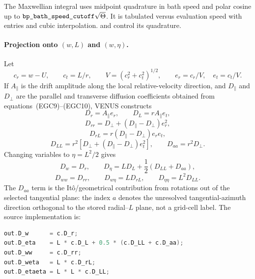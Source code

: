 The Maxwellian integral uses midpoint quadrature in bath speed and polar
cosine up to
\(\code{bp_bath_speed_cutoff}\sqrt{\Theta}\).  It is tabulated versus evaluation
speed with  entries and cubic interpolation.
 and  control its
quadrature.

\paragraph{Projection onto \((w,L)\) and \((w,\eta)\).}
Let
\[
 c_r=w-U,\qquad c_t=L/r,\qquad
 V=(c_r^2+c_t^2)^{1/2},\qquad e_r=c_r/V,\quad e_t=c_t/V.
\]
If \(A_\parallel\) is the drift amplitude along the local relative-velocity
direction, and \(D_\parallel\) and \(D_\perp\) are the parallel and transverse
diffusion coefficients obtained from equations~(EGC9)--(EGC10), VENUS
constructs
\[
 D_r=A_\parallel e_r,\qquad
 D_L=rA_\parallel e_t,                                   \tag{EGC13}
\]
\[
 D_{rr}=D_\perp+(D_\parallel-D_\perp)e_r^2,
\]
\[
 D_{rL}=r(D_\parallel-D_\perp)e_re_t,
\]
\[
 D_{LL}=r^2[D_\perp+(D_\parallel-D_\perp)e_t^2],
 \qquad D_{aa}=r^2D_\perp.                               \tag{EGC14}
\]
Changing variables to \(\eta=L^2/2\) gives
\[
 D_w=D_r,\qquad
 D_\eta=LD_L+\frac12(D_{LL}+D_{aa}),                     \tag{EGC15}
\]
\[
 D_{ww}=D_{rr},\qquad
 D_{w\eta}=LD_{rL},\qquad
 D_{\eta\eta}=L^2D_{LL}.                                 \tag{EGC16}
\]
The \(D_{aa}\) term is the It\^o/geometrical contribution from rotations out
of the selected tangential plane: the index \(a\) denotes the unresolved
tangential-azimuth direction orthogonal to the stored radial--\(L\) plane,
not a grid-cell label.  The source implementation is:
\begin{lstlisting}[language=C++]
out.D_w      = c.D_r;
out.D_eta    = L * c.D_L + 0.5 * (c.D_LL + c.D_aa);
out.D_ww     = c.D_rr;
out.D_weta   = L * c.D_rL;
out.D_etaeta = L * L * c.D_LL;
\end{lstlisting}

